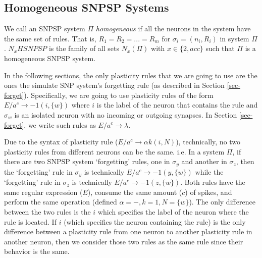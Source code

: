 \documentclass[smallextended]{svjour3}
\begin{document}

\subsection{Homogeneous SNPSP Systems}

\begin{definition}
We call an SNPSP system $\Pi$ \textit{homogeneous} if all the neurons in the system have the same set of rules. That is, $R_1 = R_2 = ... = R_m$
for $\sigma_i = (n_i, R_i)$ in system $\Pi$. $N_xHSNPSP$ is the family of all sets $N_x(\Pi)$ with $x \in \{2, acc\}$ such that $\Pi$ is a homogeneous
SNPSP system.  

\end{definition}

In the following sections, the only plasticity rules that we are going to use are the ones the simulate SNP system's forgetting rule (as described in
Section \ref{sec-forget}). Specifically, we are going to use plasticity rules of the form $E/a^c \rightarrow -1(i,\{w\})$ where $i$ is the label of
the neuron that contains the rule and $\sigma_w$ is an isolated neuron with no incoming or outgoing synapses. In Section \ref{sec-forget}, we write
such rules as $E/a^c \rightarrow \lambda$. 

Due to the syntax of plasticity rule ($E/a^c \rightarrow \alpha k (i, N)$), technically, no two plasticity rules from different neurons can be the
same. i.e. In a system $\Pi$, if there are two SNPSP system `forgetting' rules, one in $\sigma_y$ and another in $\sigma_z$, then the `forgetting'
rule in $\sigma_y$ is technically  $E/a^c \rightarrow -1(y,\{w\})$ while the `forgetting' rule in $\sigma_z$ is technically $E/a^c \rightarrow -1(z,
\{w\})$. Both rules have the same regular expression ($E$), consume the same amount ($c$) of spikes, and perform the same operation (defined 
$\alpha = -, k=1, N=\{w\}$). The only difference between the two rules is the $i$ which specifies the label of the neuron where the rule is located.
If $i$ (which specifies the neuron containing the rule) is the only difference between a plasticity rule from one neuron to another plasticity rule
in another neuron, then we consider those two rules as the same rule since their behavior is the same.


\end{document}
